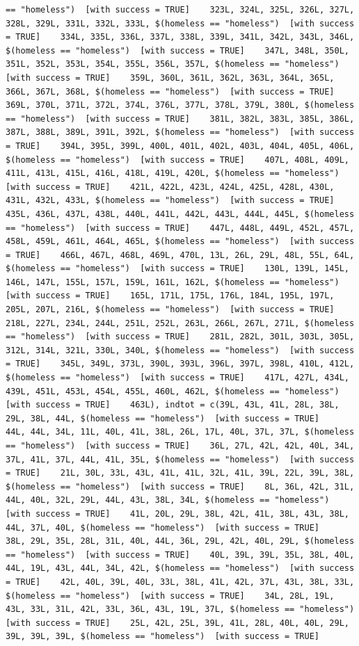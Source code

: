 \documentclass{tufte-book}\usepackage[]{graphicx}\usepackage[]{xcolor}
\makeatletter
\newenvironment{kframe}{%
 \def\at@end@of@kframe{}%
 \ifinner\ifhmode%
  \def\at@end@of@kframe{\end{minipage}}%
  \begin{minipage}{\columnwidth}%
 \fi\fi%
 \def\FrameCommand##1{\hskip\@totalleftmargin \hskip-\fboxsep
 \colorbox{shadecolor}{##1}\hskip-\fboxsep
     \hskip-\linewidth \hskip-\@totalleftmargin \hskip\columnwidth}%
 \MakeFramed {\advance\hsize-\width
   \@totalleftmargin\z@ \linewidth\hsize
   \@setminipage}}%
 {\par\unskip\endMakeFramed%
 \at@end@of@kframe}
\newenvironment{knitrout}{}{} %
\makeatother
\begin{document}
\begin{knitrout}
\begin{kframe}
\begin{verbatim}
== "homeless")  [with success = TRUE]    323L, 324L, 325L, 326L, 327L, 328L, 329L, 331L, 332L, 333L, $(homeless == "homeless")  [with success = TRUE]    334L, 335L, 336L, 337L, 338L, 339L, 341L, 342L, 343L, 346L, $(homeless == "homeless")  [with success = TRUE]    347L, 348L, 350L, 351L, 352L, 353L, 354L, 355L, 356L, 357L, $(homeless == "homeless")  [with success = TRUE]    359L, 360L, 361L, 362L, 363L, 364L, 365L, 366L, 367L, 368L, $(homeless == "homeless")  [with success = TRUE]    369L, 370L, 371L, 372L, 374L, 376L, 377L, 378L, 379L, 380L, $(homeless == "homeless")  [with success = TRUE]    381L, 382L, 383L, 385L, 386L, 387L, 388L, 389L, 391L, 392L, $(homeless == "homeless")  [with success = TRUE]    394L, 395L, 399L, 400L, 401L, 402L, 403L, 404L, 405L, 406L, $(homeless == "homeless")  [with success = TRUE]    407L, 408L, 409L, 411L, 413L, 415L, 416L, 418L, 419L, 420L, $(homeless == "homeless")  [with success = TRUE]    421L, 422L, 423L, 424L, 425L, 428L, 430L, 431L, 432L, 433L, $(homeless == "homeless")  [with success = TRUE]    435L, 436L, 437L, 438L, 440L, 441L, 442L, 443L, 444L, 445L, $(homeless == "homeless")  [with success = TRUE]    447L, 448L, 449L, 452L, 457L, 458L, 459L, 461L, 464L, 465L, $(homeless == "homeless")  [with success = TRUE]    466L, 467L, 468L, 469L, 470L, 13L, 26L, 29L, 48L, 55L, 64L, $(homeless == "homeless")  [with success = TRUE]    130L, 139L, 145L, 146L, 147L, 155L, 157L, 159L, 161L, 162L, $(homeless == "homeless")  [with success = TRUE]    165L, 171L, 175L, 176L, 184L, 195L, 197L, 205L, 207L, 216L, $(homeless == "homeless")  [with success = TRUE]    218L, 227L, 234L, 244L, 251L, 252L, 263L, 266L, 267L, 271L, $(homeless == "homeless")  [with success = TRUE]    281L, 282L, 301L, 303L, 305L, 312L, 314L, 321L, 330L, 340L, $(homeless == "homeless")  [with success = TRUE]    345L, 349L, 373L, 390L, 393L, 396L, 397L, 398L, 410L, 412L, $(homeless == "homeless")  [with success = TRUE]    417L, 427L, 434L, 439L, 451L, 453L, 454L, 455L, 460L, 462L, $(homeless == "homeless")  [with success = TRUE]    463L), indtot = c(39L, 43L, 41L, 28L, 38L, 29L, 38L, 44L, $(homeless == "homeless")  [with success = TRUE]    44L, 44L, 34L, 11L, 40L, 41L, 38L, 26L, 17L, 40L, 37L, 37L, $(homeless == "homeless")  [with success = TRUE]    36L, 27L, 42L, 42L, 40L, 34L, 37L, 41L, 37L, 44L, 41L, 35L, $(homeless == "homeless")  [with success = TRUE]    21L, 30L, 33L, 43L, 41L, 41L, 32L, 41L, 39L, 22L, 39L, 38L, $(homeless == "homeless")  [with success = TRUE]    8L, 36L, 42L, 31L, 44L, 40L, 32L, 29L, 44L, 43L, 38L, 34L, $(homeless == "homeless")  [with success = TRUE]    41L, 20L, 29L, 38L, 42L, 41L, 38L, 43L, 38L, 44L, 37L, 40L, $(homeless == "homeless")  [with success = TRUE]    38L, 29L, 35L, 28L, 31L, 40L, 44L, 36L, 29L, 42L, 40L, 29L, $(homeless == "homeless")  [with success = TRUE]    40L, 39L, 39L, 35L, 38L, 40L, 44L, 19L, 43L, 44L, 34L, 42L, $(homeless == "homeless")  [with success = TRUE]    42L, 40L, 39L, 40L, 33L, 38L, 41L, 42L, 37L, 43L, 38L, 33L, $(homeless == "homeless")  [with success = TRUE]    34L, 28L, 19L, 43L, 33L, 31L, 42L, 33L, 36L, 43L, 19L, 37L, $(homeless == "homeless")  [with success = TRUE]    25L, 42L, 25L, 39L, 41L, 28L, 40L, 40L, 29L, 39L, 39L, 39L, $(homeless == "homeless")  [with success = TRUE]    
\end{verbatim}
\end{kframe}
\end{knitrout}
\end{document}
